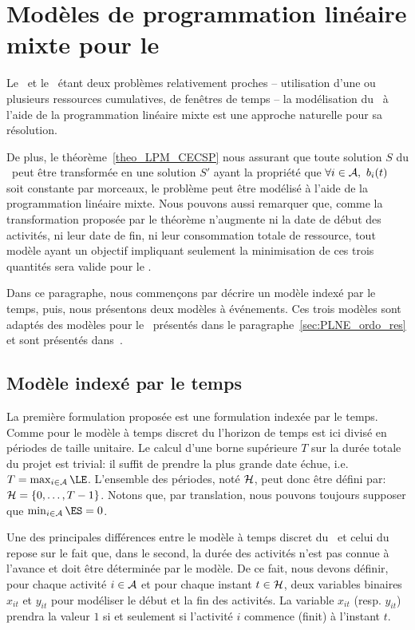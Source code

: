 \section{Modèles de programmation linéaire mixte pour le
\CECSP}

Le \CECSP ~et le \RCPSP~étant deux problèmes relativement proches --
utilisation d'une ou plusieurs ressources cumulatives, de fenêtres de
temps -- la modélisation du \CECSP~à l'aide de la programmation
linéaire mixte est une approche naturelle pour
sa résolution. 

De plus, le théorème~\ref{theo_LPM_CECSP} nous assurant que toute solution
$S$ du \CECSP~peut être transformée en une solution $S'$ ayant la
propriété que $\forall i \in \A,\ b_i(t)$ soit constante par morceaux,
le problème peut être modélisé à l'aide de la programmation linéaire
mixte. Nous pouvons aussi remarquer que, comme la transformation
proposée par le théorème n'augmente ni la date de début des activités,
ni leur date de fin, ni leur consommation totale de ressource, tout modèle
ayant un objectif impliquant seulement la minimisation de ces trois
quantités sera valide pour le \CECSP.

Dans ce paragraphe, nous commençons par décrire un modèle indexé par
le temps, puis, nous présentons deux modèles à événements. Ces trois
modèles sont adaptés des modèles pour le \RCPSP~présentés dans le
paragraphe~\ref{sec:PLNE_ordo_res} et sont présentés
dans~\cite{Nattaf_ORSpectrum}.   


\subsection{Modèle indexé par le temps}

La première formulation proposée est une formulation indexée par le
temps. Comme pour le modèle à temps discret du \RCPSP l'horizon de
temps est ici divisé en périodes de taille unitaire. Le calcul d'une
borne supérieure $T$ sur la durée totale du projet est trivial: il
suffit de prendre la plus grande date échue, i.e. $T=\max_{i \in \A}
\LE$. L'ensemble des périodes, noté ${\cal H}$, peut donc être défini par:
${\cal H}=\{0,\dots,T-1\}$.  Notons que, par translation, nous pouvons
toujours supposer que $\min_{i\in \A} \ES=0$.

Une des principales différences entre le modèle à temps discret du
\RCPSP~et celui du \CECSP~ repose sur le fait que, dans le
second, la durée des activités n'est pas connue à l'avance et doit
être déterminée par le modèle. De ce fait, nous devons définir,
pour chaque activité $i \in {\cal A}$ et pour chaque instant $t
\in {\cal H}$, deux variables binaires $x_{it}$ et $y_{it}$ pour
modéliser le début et la fin des activités. La variable $x_{it}$
(resp. $y_{it}$) prendra la valeur $1$ si et seulement si
l'activité $i$ commence (finit) à l'instant $t$.

